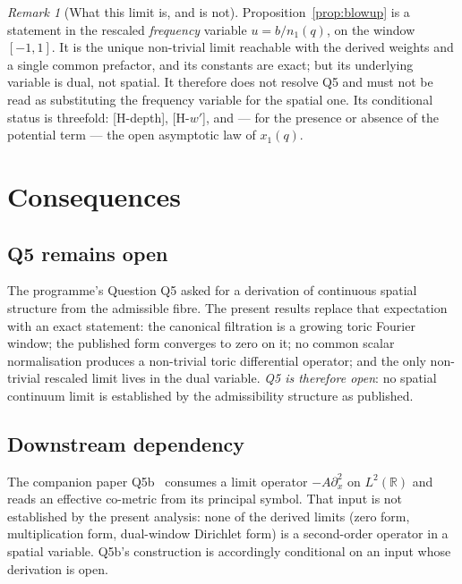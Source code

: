 \documentclass[11pt,a4paper]{article}
\theoremstyle{plain}
\theoremstyle{definition}
\theoremstyle{remark}
\newtheorem{remark}[theorem]{Remark}
\newcommand{\R}{\mathbb{R}}
\begin{document}
    \begin{remark}[What this limit is, and is not]
      \label{rem:dual-status}
      Proposition~\ref{prop:blowup} is a statement in the rescaled \emph{frequency} variable
      $u = b/n_1(q)$, on the window $[-1,1]$.
      It is the unique non-trivial limit reachable with the derived weights and a single common
      prefactor, and its constants are exact; but its underlying variable is dual, not spatial.
      It therefore does not resolve Q5 and must not be read as substituting the frequency variable for
      the spatial one.
      Its conditional status is threefold: [H-depth], [H-$w'$], and --- for the presence or absence of
      the potential term --- the open asymptotic law of $x_1(q)$.
    \end{remark}

  \section{Consequences}
  \label{sec:consequences}

  \subsection{Q5 remains open}

    The programme's Question Q5 asked for a derivation of continuous spatial structure from the
    admissible fibre.
    The present results replace that expectation with an exact statement:
    the canonical filtration is a growing toric Fourier window; the published form converges to zero on
    it; no common scalar normalisation produces a non-trivial toric differential operator; and the only
    non-trivial rescaled limit lives in the dual variable.
    \emph{Q5 is therefore open}: no spatial continuum limit is established by the admissibility
    structure as published.

  \subsection{Downstream dependency}

    The companion paper Q5b~\cite{Beau2026q5b} consumes a limit operator $-A\partial_x^2$ on $L^2(\R)$
    and reads an effective co-metric from its principal symbol.
    That input is not established by the present analysis: none of the derived limits (zero form,
    multiplication form, dual-window Dirichlet form) is a second-order operator in a spatial variable.
    Q5b's construction is accordingly conditional on an input whose derivation is open.
\end{document}
